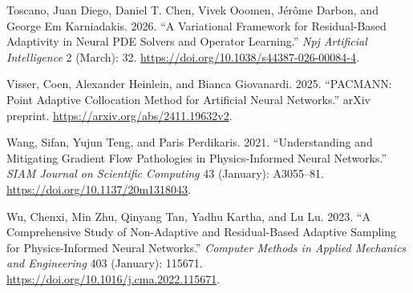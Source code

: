 \documentclass[
  11pt,
]{article}
\newlength{\cslhangindent}
\newlength{\cslentryspacingunit} %
\newenvironment{CSLReferences}[2] %
 {%
  \setlength{\parindent}{0pt}
  \ifodd #1
  \let\oldpar\par
  \def\par{\hangindent=\cslhangindent\oldpar}
  \fi
  \setlength{\parskip}{#2\cslentryspacingunit}
 }%
 {}
\begin{document}
\begin{CSLReferences}{1}{0}
\leavevmode{}%
Toscano, Juan Diego, Daniel T. Chen, Vivek Ooomen, Jérôme Darbon, and
George Em Karniadakis. 2026. {``A Variational Framework for
Residual-Based Adaptivity in Neural PDE Solvers and Operator
Learning.''} \emph{Npj Artificial Intelligence} 2 (March): 32.
\url{https://doi.org/10.1038/s44387-026-00084-4}.

\leavevmode{}%
Visser, Coen, Alexander Heinlein, and Bianca Giovanardi. 2025.
{``PACMANN: Point Adaptive Collocation Method for Artificial Neural
Networks.''} arXiv preprint. \url{https://arxiv.org/abs/2411.19632v2}.

\leavevmode{}%
Wang, Sifan, Yujun Teng, and Paris Perdikaris. 2021. {``Understanding
and Mitigating Gradient Flow Pathologies in Physics-Informed Neural
Networks.''} \emph{SIAM Journal on Scientific Computing} 43 (January):
A3055--81. \url{https://doi.org/10.1137/20m1318043}.

\leavevmode{}%
Wu, Chenxi, Min Zhu, Qinyang Tan, Yadhu Kartha, and Lu Lu. 2023. {``A
Comprehensive Study of Non-Adaptive and Residual-Based Adaptive Sampling
for Physics-Informed Neural Networks.''} \emph{Computer Methods in
Applied Mechanics and Engineering} 403 (January): 115671.
\url{https://doi.org/10.1016/j.cma.2022.115671}.

\end{CSLReferences}
\end{document}
